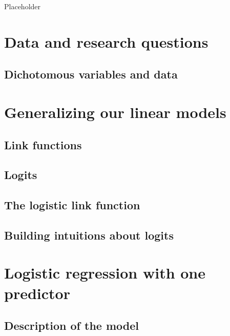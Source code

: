 \documentclass[
]{book}
\begin{document}
Placeholder

\hypertarget{data-and-research-questions-6}{%
\section{Data and research questions}\label{data-and-research-questions-6}}

\hypertarget{dichotomous-variables-and-data}{%
\subsection{Dichotomous variables and data}\label{dichotomous-variables-and-data}}

\hypertarget{generalizing-our-linear-models}{%
\section{Generalizing our linear models}\label{generalizing-our-linear-models}}

\hypertarget{link-functions}{%
\subsection{Link functions}\label{link-functions}}

\hypertarget{logits}{%
\subsection{Logits}\label{logits}}

\hypertarget{the-logistic-link-function}{%
\subsection{The logistic link function}\label{the-logistic-link-function}}

\hypertarget{building-intuitions-about-logits}{%
\subsection{Building intuitions about logits}\label{building-intuitions-about-logits}}

\hypertarget{logistic-regression-with-one-predictor}{%
\section{Logistic regression with one predictor}\label{logistic-regression-with-one-predictor}}

\hypertarget{description-of-the-model-9}{%
\subsection{Description of the model}\label{description-of-the-model-9}}
\end{document}
